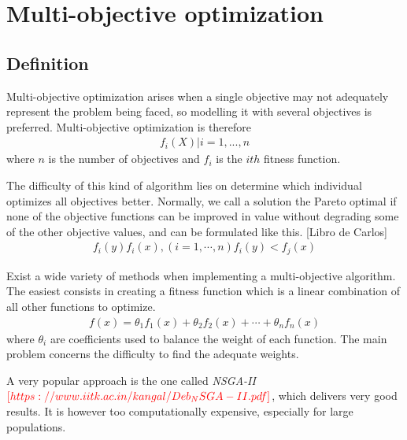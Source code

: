 \documentclass{llncs}
\begin{document}
%
\section{Multi-objective optimization}
\label{sec:sec3}
%

\subsection{Definition}

Multi-objective optimization arises when a single objective may not adequately represent the problem being faced, so modelling it with several objectives is preferred. Multi-objective optimization is therefore
\begin{equation}
\begin{aligned}
f_i(X) | i = 1,...,n
\end{aligned}
\end{equation}
where $n$ is the number of objectives and $f_i$ is the $ith$ fitness function.

The difficulty of this kind of algorithm lies on determine which individual optimizes all objectives better. Normally, we call a solution the Pareto optimal if none of the objective functions can be improved in value without degrading some of the other objective values, and can be formulated like this. {\color{red}[Libro de Carlos]}
\begin{equation}
\begin{aligned}
f_i(y) f_i(x), (i=1,\cdots,n) f_i(y) < f_j(x)
\end{aligned}
\end{equation}

Exist a wide variety of methods when implementing a multi-objective algorithm. The easiest consists in creating a fitness function which is a linear combination of all other functions to optimize.
\begin{equation}
\begin{aligned}
f(x) = \theta_1f_1(x) +\theta_2f_2(x) +\cdots+\theta_nf_n(x)
\end{aligned}
\end{equation}
where $\theta_i$ are coefficients used to balance the weight of each function. The main problem concerns the difficulty to find the adequate weights.

A very popular approach is the one called \textit{NSGA-II} ${\color{red}[https://www.iitk.ac.in/kangal/Deb_NSGA-II.pdf]}$, which delivers very good results. It is however too computationally expensive, especially for large populations.
\end{document}
